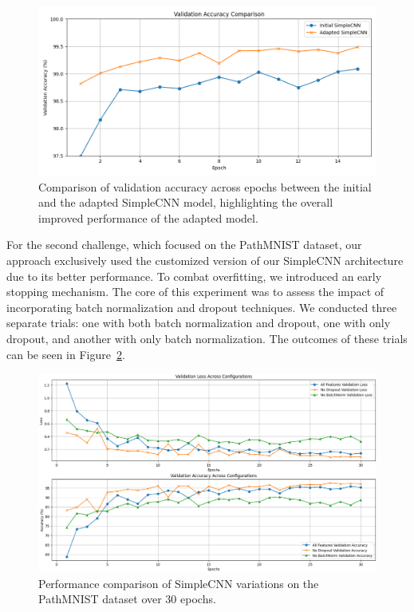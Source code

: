 \begin{figure} [ht]
    \centering
    \includegraphics[width=.9\textwidth]{figures/simpleCNN_old_vs_new.png}
    \caption{Comparison of validation accuracy across epochs between the initial and the adapted SimpleCNN model, highlighting the overall improved performance of the adapted model.}\label{fig:SimpleCNN_old_new}
\end{figure}

For the second challenge, which focused on the PathMNIST dataset, our approach exclusively used the customized version of our SimpleCNN architecture due to its better performance. To combat overfitting, we introduced an early stopping mechanism. The core of this experiment was to assess the impact of incorporating batch normalization and dropout techniques. We conducted three separate trials: one with both batch normalization and dropout, one with only dropout, and another with only batch normalization. The outcomes of these trials can be seen in Figure~\ref{fig:pathMNIST_variations}.

\begin{figure} [ht]
  \centering
  \includegraphics[width=1\textwidth]{figures/simpleCNN_PathMNIST_variations.png}
  \caption{Performance comparison of SimpleCNN variations on the PathMNIST dataset over 30 epochs.}\label{fig:pathMNIST_variations}
\end{figure}